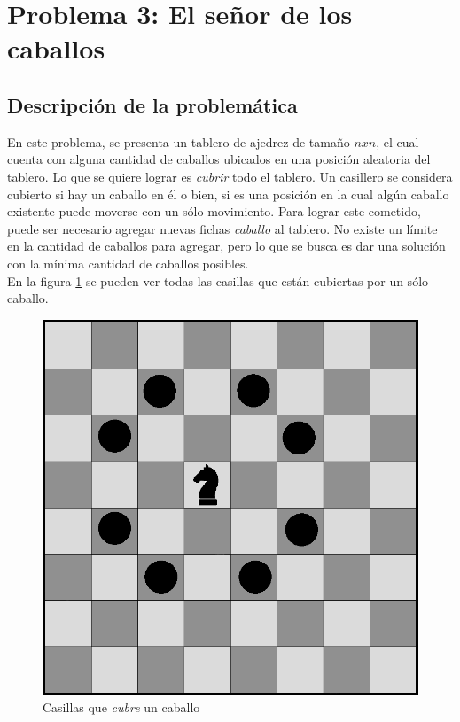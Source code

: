 \section{Problema 3: El se\~nor de los caballos}
\subsection{Descripci\'on de la problem\'atica}

En este problema, se presenta un tablero de ajedrez de tama\~no $nxn$, el cual cuenta con alguna cantidad de caballos ubicados en una posici\'on aleatoria del tablero. Lo que se quiere lograr es \emph{cubrir} todo el tablero. Un casillero se considera cubierto si hay un caballo en \'el o bien, si es una posici\'on en la cual alg\'un caballo existente puede moverse con un s\'olo movimiento. Para lograr este cometido, puede ser necesario agregar nuevas fichas \emph{caballo} al tablero. No existe un l\'imite en la cantidad de caballos para agregar, pero lo que se busca es dar una soluci\'on con la m\'inima cantidad de caballos posibles.\\


En la figura \ref{caballito} se pueden ver todas las casillas que est\'an cubiertas por un s\'olo caballo.


 \begin{figure}[h!]
   \begin{center}
 	\includegraphics[scale=0.3]{imagenes/ej3/caballito.png}
 	\caption{Casillas que \emph{cubre} un caballo}
 	\label{caballito}	
   \end{center}
 \end{figure}



